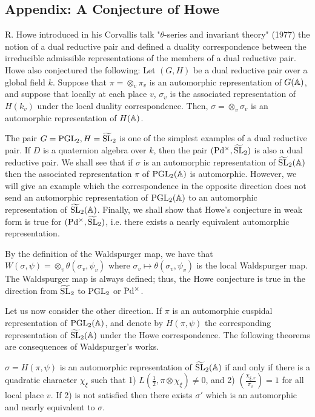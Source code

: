 \begin{appendices}
\section{Appendix: A Conjecture of Howe}

R. Howe introduced in his Corvallis talk "$\theta$-series and invariant theory" (1977) the notion of a dual reductive pair and defined a duality correspondence between the irreducible admissible representations of the members of a dual reductive pair.
Howe also conjectured the following: Let $(G, H)$ be a dual reductive pair over a global field $k$.
Suppose that $\pi = \otimes_v \pi_v$ is an automorphic representation of $G(\mathbb{A})$, and suppose that locally at each place $v$, $\sigma_v$ is the associated representation of $H(k_v)$ under the local duality correspondence.
Then, $\sigma = \otimes_v \sigma_v$ is an automorphic representation of $H(\mathbb{A})$.

The pair $G = \mathrm{PGL}_2, H = \widetilde{\mathrm{SL}}_2$ is one of the simplest examples of a dual reductive pair.
If $D$ is a quaternion algebra over $k$, then the pair $(\mathrm{P} \mathrm{d}^\times, \widetilde{\mathrm{SL}}_2)$ is also a dual reductive pair. 
We shall see that if $\sigma$ is an automorphic representation of $\widetilde{\mathrm{SL}}_2(\mathbb{A})$ then the associated representation $\pi$ of $\mathrm{PGL}_2(\mathbb{A})$ is automorphic.
However, we will give an example which the correspondence in the opposite direction does not send an automorphic representation of $\mathrm{PGL}_2(\mathbb{A})$ to an automorphic representation of $\widetilde{\mathrm{SL}}_2(\mathbb{A})$.
Finally, we shall show that Howe's conjecture in weak
form is true for $(\mathrm{P} \mathrm{d}^\times, \widetilde{\mathrm{SL}}_2)$, i.e. there exists a nearly equivalent automorphic representation.

By the definition of the Waldspurger map, we have that $W(\sigma, \psi) = \otimes_v \theta(\sigma_v, \psi_v)$ where $\sigma_v \mapsto \theta(\sigma_v, \psi_v)$ is the local Waldspurger map.
The Waldspurger map is always defined; thus, the Howe conjecture is true in the direction from $\widetilde{\mathrm{SL}}_2$ to $\mathrm{PGL}_2$ or $\mathrm{P} \mathrm{d}^\times$.

Let us now consider the other direction.
If $\pi$ is an automorphic cuspidal representation of $\mathrm{PGL}_2(\mathbb{A})$, and denote by $H(\pi, \psi)$ the
corresponding representation of $\widetilde{\mathrm{SL}}_2(\mathbb{A})$ under the Howe correspondence.
The following theorems are consequences of Waldspurger's works.

\begin{theorem}
\label{thm:a.1}
$\sigma = H(\pi, \psi)$ is an automorphic representation of $\widetilde{\mathrm{SL}}_2(\mathbb{A})$ if and only if there is a quadratic character $\chi_\xi$ such that 1) $L(\frac{1}{2}, \pi \otimes \chi_\xi) \neq 0$, and 2) $\left(\frac{\chi_{\xi, v}}{\pi_v}\right) = 1$ for all local place $v$.
If 2) is not satisfied then there exists $\sigma'$ which is an automorphic and nearly equivalent to $\sigma$.
\end{theorem}


\end{appendices}
